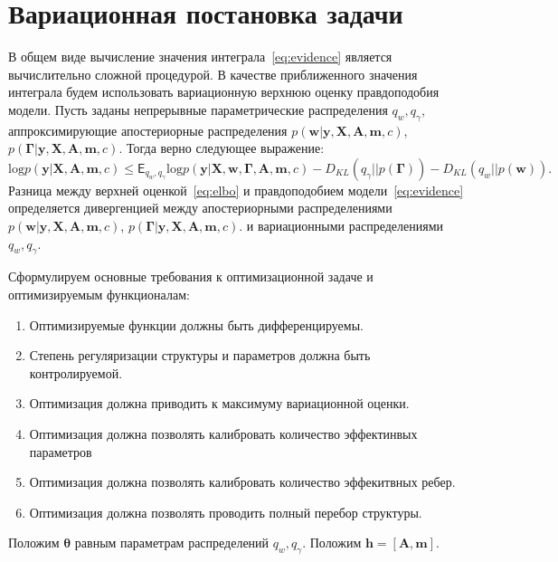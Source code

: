 \documentclass[12pt]{article}
\begin{document}
\section{Вариационная постановка задачи}
В общем виде вычисление значения интеграла~\eqref{eq:evidence} является вычислительно сложной процедурой. В качестве приближенного значения интеграла будем использовать вариационную верхнюю оценку правдоподобия модели. Пусть заданы непрерывные параметрические распределения $q_w, q_\gamma$, аппроксимирующие апостериорные распределения $p(\mathbf{w}|\mathbf{y}, \mathbf{X}, \mathbf{A},\mathbf{m}, c)$, $p(\boldsymbol{\Gamma}|\mathbf{y}, \mathbf{X}, \mathbf{A},\mathbf{m}, c).$ Тогда верно следующее выражение:
\begin{equation}
\label{eq:elbo}
    \text{log} p(\mathbf{y}|\mathbf{X},\mathbf{A},\mathbf{m}, c)  \leq \mathsf{E}_{q_w,q_\gamma}\text{log} p(\mathbf{y}|\mathbf{X},\mathbf{w}, \boldsymbol{\Gamma}, \mathbf{A},\mathbf{m}, c) - {D_{KL}}(q_\gamma||p(\boldsymbol{\Gamma})) - {D_{KL}}(q_{w}||p(\mathbf{w})).
\end{equation}
Разница между верхней оценкой~\eqref{eq:elbo} и правдоподобием модели~\eqref{eq:evidence} определяется дивергенцией между апостериорными распределениями $p(\mathbf{w}|\mathbf{y}, \mathbf{X}, \mathbf{A},\mathbf{m}, c)$, $p(\boldsymbol{\Gamma}|\mathbf{y}, \mathbf{X}, \mathbf{A},\mathbf{m}, c).$ и вариационными распределениями  $q_w, q_\gamma$.

Сформулируем основные требования к оптимизационной задаче и оптимизируемым функционалам:
\begin{enumerate}
\item Оптимизируемые функции должны быть дифференцируемы.
\item Степень регуляризации структуры и параметров должна быть контролируемой.
\item Оптимизация должна приводить к максимуму вариационной оценки.
\item Оптимизация должна позволять калибровать количество эффектинвых параметров
\item Оптимизация должна позволять калибровать количество эффекитвных ребер.
\item Оптимизация должна позволять проводить полный перебор структуры.
\end{enumerate}

Положим $\boldsymbol{\theta}$ равным параметрам распределений $q_w, q_\gamma$. 
Положим $\mathbf{h} = [\mathbf{A}, \mathbf{m}].$
\end{document}
